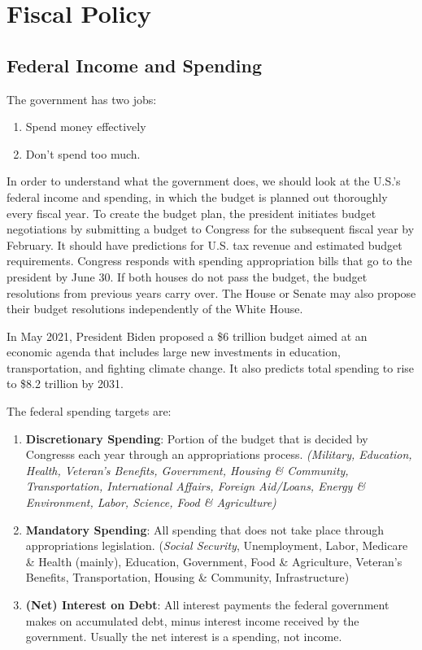 \documentclass{article}
\begin{document}
\section{Fiscal Policy}

  \subsection{Federal Income and Spending}

    The government has two jobs: 
    \begin{enumerate}
      \item Spend money effectively 
      \item Don't spend too much. 
    \end{enumerate}

    In order to understand what the government does, we should look at the U.S.'s federal income and spending, in which the budget is planned out thoroughly every fiscal year. To create the budget plan, the president initiates budget negotiations by submitting a budget to Congress for the subsequent fiscal year by February. It should have predictions for U.S. tax revenue and estimated budget requirements. Congress responds with spending appropriation bills that go to the president by June 30. If both houses do not pass the budget, the budget resolutions from previous years carry over. The House or Senate may also propose their budget resolutions independently of the White House. 

    \begin{example}
      In May 2021, President Biden proposed a \$6 trillion budget aimed at an economic agenda that includes large new investments in education, transportation, and fighting climate change. It also predicts total spending to rise to \$8.2 trillion by 2031.
    \end{example}

    \begin{definition}
      The federal spending targets are: 
      \begin{enumerate}
        \item \textbf{Discretionary Spending}: Portion of the budget that is decided by Congresss each year through an appropriations process. \textit{(Military, Education, Health, Veteran's Benefits, Government, Housing \& Community, Transportation, International Affairs, Foreign Aid/Loans, Energy \& Environment, Labor, Science, Food \& Agriculture)}
        \item \textbf{Mandatory Spending}: All spending that does not take place through appropriations legislation. (\textit{Social Security}, Unemployment, Labor, Medicare \& Health (mainly), Education, Government, Food \& Agriculture, Veteran's Benefits, Transportation, Housing \& Community, Infrastructure)
        \item \textbf{(Net) Interest on Debt}: All interest payments the federal government makes on accumulated debt, minus interest income received by the government. Usually the net interest is a spending, not income.
      \end{enumerate}
    \end{definition}
\end{document}
